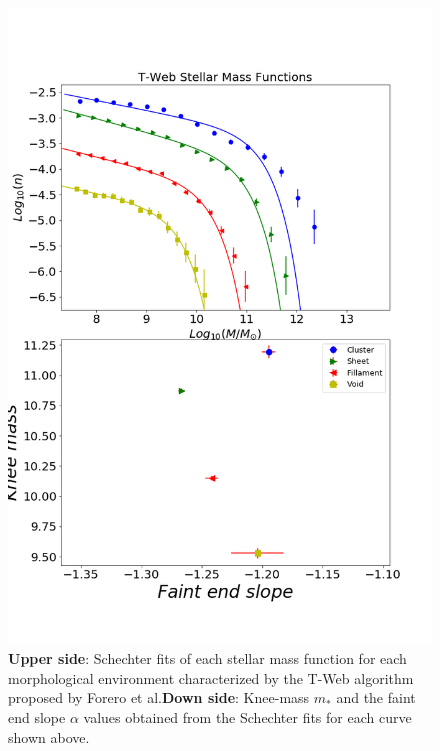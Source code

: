 \documentclass[a4paper,fleqn,usenatbib]{mnras}
\begin{document}
\begin{figure}
	\includegraphics[width=\columnwidth]{./pics/T-Web_Stellar.png}
    \caption{\textbf{Upper side}: Schechter fits of each stellar mass function for each morphological environment characterized by the T-Web algorithm proposed by Forero et al.\textbf{Down side}: Knee-mass $m_\ast$ and the faint end slope $\alpha$ values obtained from the Schechter fits for each curve shown above.}
    \label{fig:TwebStellar}
\end{figure}
\end{document}
